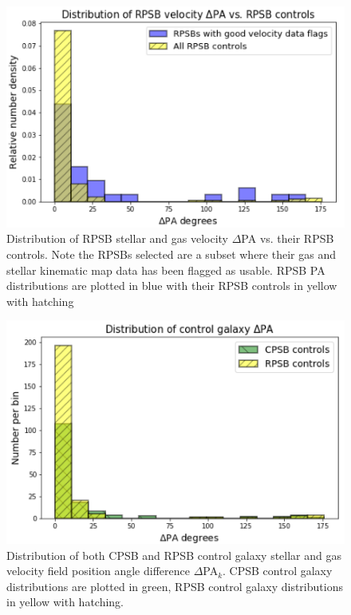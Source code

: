 \begin{figure}
    \centering
    \includegraphics[width=\columnwidth]{images/JupyterPlots/DIST-Good-RPSB+Flags+Controls.png}
    \caption[Distribution of RPSB velocity $\Delta$PA vs. their RPSB controls]{Distribution of RPSB stellar and gas velocity $\Delta$PA vs. their RPSB controls. Note the RPSBs selected are a subset where their gas and stellar kinematic map data has been flagged as usable. RPSB PA distributions are plotted in blue with their RPSB controls in yellow with hatching}
    \label{fig:RPSBvsControlDeltaPAs}
\end{figure}


\begin{figure}
    \centering
    \includegraphics[width=\columnwidth]{images/JupyterPlots/DIST-Control-DPA-both.png}
    \caption[Distribution of control galaxy $\Delta$PA$_{k}$]{Distribution of both CPSB and RPSB control galaxy stellar and gas velocity field position angle difference $\Delta$PA$_{k}$. CPSB control galaxy distributions are plotted in green, RPSB control galaxy distributions in yellow with hatching.}
    \label{fig:controlDeltaPAs}
\end{figure}

